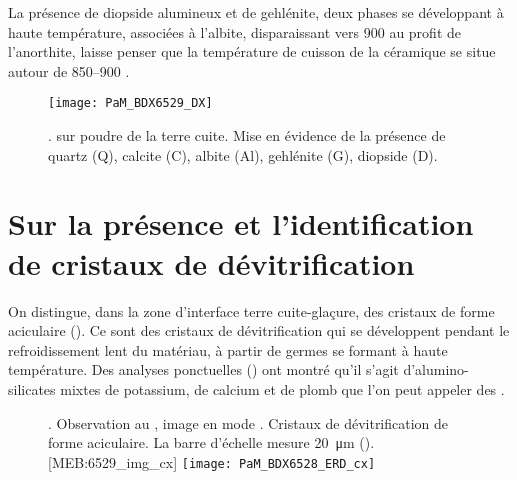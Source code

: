 La présence de diopside alumineux et de gehlénite, deux phases se 
développant à haute température, associées à l'albite, disparaissant 
vers \SI{900}{\degC} au profit de l'anorthite, laisse penser que la 
température de cuisson de la céramique se situe autour de 
\SIrange{850}{900}{\degC} \autocite{Peters_1978}.

\begin{figure}[htb]
  \texttt{[image: PaM\_BDX6529\_DX]}
  \caption[\ -- Diffraction de \RX sur poudre 
           de la terre cuite]
          {\legendeB.
           \DX[D] sur poudre de la terre cuite. 
           Mise en évidence de la présence de quartz (Q), 
           calcite (C), albite (Al), gehlénite (G), diopside (D).}
  \label{DRX:6529}
\end{figure}


\section{Sur la présence et l'identification de cristaux de 
         dévitrification}

On distingue, dans la zone d'interface terre cuite-glaçure, des 
cristaux de forme aciculaire (). Ce sont 
des cristaux de dévitrification qui se développent pendant le 
refroidissement lent du matériau, à partir de germes se formant à 
haute température. Des analyses ponctuelles () 
ont montré qu'il s'agit d'alumino-silicates mixtes de potassium, de 
calcium et de plomb que l'on peut appeler des .

\begin{figure}[htb]
  \setlength{\imgwidth}{7cm}
  \setlength{\mylength}{1cm+\imgwidth}
  \setlength{\sidecapwidth}{\linewidth-\sidecapsep-\mylength-1cm}
  \renewcommand*{\sidecapfloatwidth}{\mylength}%
  \RaggedLeft
  \begin{sidecaption}{%
    \legendeB.
    Observation au \MEB, image en mode \ERD. 
    Cristaux de dévitrification de forme aciculaire. La barre 
    d'échelle mesure \SI{20}{\um} ().%
  }[MEB:6529_img_cx]
    \texttt{[image: PaM\_BDX6528\_ERD\_cx]}%
  \end{sidecaption}
\end{figure}


